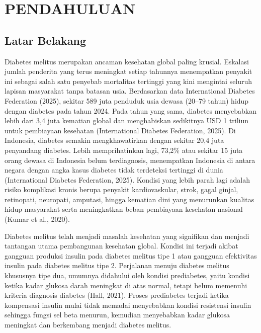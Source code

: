 \documentclass[a4paper,12pt]{article}
\begin{document}
\tableofcontents
\newpage
\listoffigures
\newpage
\listoftables
\newpage

\section{PENDAHULUAN}

\subsection{Latar Belakang}

Diabetes melitus merupakan ancaman kesehatan global paling krusial. Eskalasi jumlah penderita yang terus meningkat setiap tahunnya menempatkan penyakit ini sebagai salah satu penyebab mortalitas tertinggi yang kini mengintai seluruh lapisan masyarakat tanpa batasan usia. Berdasarkan data International Diabetes Federation (2025), sekitar 589 juta penduduk usia dewasa (20–79 tahun) hidup dengan diabetes pada tahun 2024. Pada tahun yang sama, diabetes menyebabkan lebih dari 3,4 juta kematian global dan menghabiskan sedikitnya USD 1 triliun untuk pembiayaan kesehatan (International Diabetes Federation, 2025). Di Indonesia, diabetes semakin mengkhawatirkan dengan sekitar 20,4 juta penyandang diabetes. Lebih memprihatinkan lagi, 73,2\% atau sekitar 15 juta orang dewasa di Indonesia belum terdiagnosis, menempatkan Indonesia di antara negara dengan angka kasus diabetes tidak terdeteksi tertinggi di dunia (International Diabetes Federation, 2025). Kondisi yang lebih parah lagi adalah risiko komplikasi kronis berupa penyakit kardiovaskular, strok, gagal ginjal, retinopati, neuropati, amputasi, hingga kematian dini yang menurunkan kualitas hidup masyarakat serta meningkatkan beban pembiayaan kesehatan nasional (Kumar et al., 2020).

Diabetes melitus telah menjadi masalah kesehatan yang signifikan dan menjadi tantangan utama pembangunan kesehatan global. Kondisi ini terjadi akibat gangguan produksi insulin pada diabetes melitus tipe 1 atau gangguan efektivitas insulin pada diabetes melitus tipe 2. Perjalanan menuju diabetes melitus khususnya tipe dua, umumnya didahului oleh kondisi prediabetes, yaitu kondisi ketika kadar glukosa darah meningkat di atas normal, tetapi belum memenuhi kriteria diagnosis diabetes (Hall, 2021). Proses prediabetes terjadi ketika kompensasi insulin mulai tidak memadai menyebabkan kondisi resistensi insulin sehingga fungsi sel beta menurun, kemudian menyebabkan kadar glukosa meningkat dan berkembang menjadi diabetes melitus.
\end{document}
